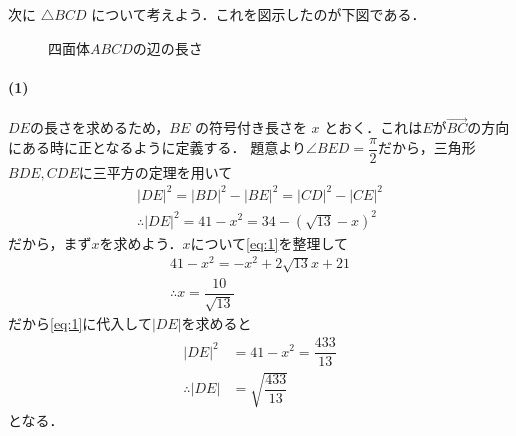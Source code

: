 \documentclass[../../main.tex]{subfiles}
\begin{document}
次に $\triangle BCD$ について考えよう．これを図示したのが下図である．

\begin{figure}[htb]
  \begin{center}
    \caption{四面体$ABCD$の辺の長さ}
  \end{center}
\end{figure}

\paragraph{(1)}
$DE$の長さを求めるため，$BE$ の符号付き長さを $x$ とおく．これは$E$が$\overrightarrow{BC}$の方向にある時に正となるように定義する．
題意より$\angle BED = \dfrac{\pi}{2}$だから，三角形$BDE, CDE$に三平方の定理を用いて
\begin{align}
  |DE|^2 = |BD|^2-|BE|^2 = |CD|^2-|CE|^2 \\
  \therefore
  |DE|^2 = 41 - x^2 = 34 - (\sqrt{13} - x)^2 \label{eq:1}
\end{align}
だから，まず$x$を求めよう．$x$について\cref{eq:1}を整理して
\begin{align}
  41 - x^2 = -x^2 + 2\sqrt{13}x + 21 \\
  \therefore
  x = \dfrac{10}{\sqrt{13}}
\end{align}
だから\cref{eq:1}に代入して$|DE|$を求めると
\begin{align}
  |DE|^2 &= 41 - x^2 = \dfrac{433}{13} \\
  \therefore
  |DE|   &= \sqrt{\dfrac{433}{13}}
\end{align}
となる．
\end{document}
